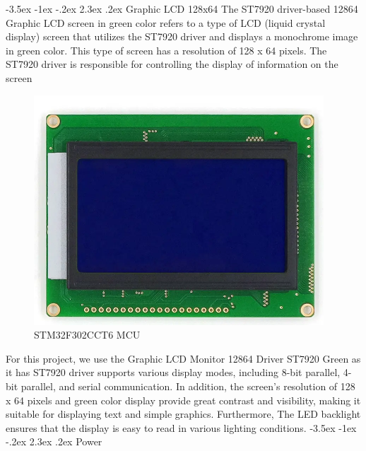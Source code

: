 \documentclass[a4paper, twoside]{report}
\makeatletter
\renewcommand\section{\@startsection {section}{1}{-1em}%
  {-3.5ex \@plus -1ex \@minus -.2ex}%
  {2.3ex \@plus.2ex}%
  {\normalfont\Large\bfseries}}
\makeatother
\begin{document}
\section{Graphic LCD 128x64}
The ST7920 driver-based 12864 Graphic LCD screen in green color refers to a type of LCD (liquid crystal display) screen that utilizes the ST7920 driver and displays a monochrome image in green color. This type of screen has a resolution of 128 x 64 pixels. The ST7920 driver is responsible for controlling the display of information on the screen
\begin{figure}[H]
    \begin{center}
    \includegraphics[width=.7\textwidth]{images/LCD.png}
    \caption{STM32F302CCT6 MCU}
    \end{center}
\end{figure} 
For this project, we use the Graphic LCD Monitor 12864 Driver ST7920 Green as it has ST7920 driver supports various display modes, including 8-bit parallel, 4-bit parallel, and serial communication. In addition, the screen's resolution of 128 x 64 pixels and green color display provide great contrast and visibility, making it suitable for displaying text and simple graphics. Furthermore, The LED backlight ensures that the display is easy to read in various lighting conditions. 
\newpage
\section{Power}
\end{document}
